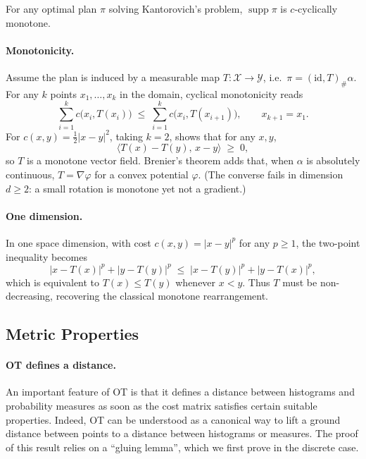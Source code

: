 \begin{thm}[Rockafellar]\label{thm:opt_ccm}
For any optimal plan $\pi$ solving Kantorovich's problem,
$\operatorname{supp}\pi$ is $c$-cyclically monotone.
\end{thm}


\paragraph{Monotonicity.}

Assume the plan is induced by a measurable map
$T:\mathcal{X}\to \mathcal{Y}$, i.e.\ $\pi=(\mathrm{id},T)_\#\alpha$.  
For any $k$ points $x_1,\dots,x_k$ in the domain, cyclical
monotonicity reads
\[
  \sum_{i=1}^k c\bigl(x_i,T(x_i)\bigr)
  \;\le\;
  \sum_{i=1}^k c\bigl(x_i,T(x_{i+1})\bigr),\qquad x_{k+1}=x_1.
\]
For $c(x,y)=\tfrac12|x-y|^2$, taking $k=2$, shows that for any $x,y$,
\[
  \langle T(x)-T(y),\,x-y\rangle\;\ge\;0,
\]
so $T$ is a monotone vector field.  
Brenier's theorem adds that, when $\alpha$ is absolutely continuous,
$T=\nabla\varphi$ for a convex potential $\varphi$.  
(The converse fails in dimension $d\ge2$: a small rotation is monotone
yet not a gradient.)

\paragraph{One dimension.}

In one space dimension, with cost $c(x,y)=|x-y|^p$ for any $p\ge1$, the
two-point inequality becomes
\[
  |x-T(x)|^p+|y-T(y)|^p
  \;\le\;
  |x-T(y)|^p+|y-T(x)|^p,
\]
which is equivalent to $T(x)\le T(y)$ whenever $x<y$.  Thus $T$ must be
non-decreasing, recovering the classical monotone rearrangement.

\subsection{Metric Properties}

\paragraph{OT defines a distance.}

An important feature of OT is that it defines a distance between histograms and probability measures as soon as the cost matrix satisfies certain suitable properties. Indeed, OT can be understood as a canonical way to lift a ground distance between points to a distance between histograms or measures. 
%
The proof of this result relies on a ``gluing lemma'', which we first prove in the discrete case.

